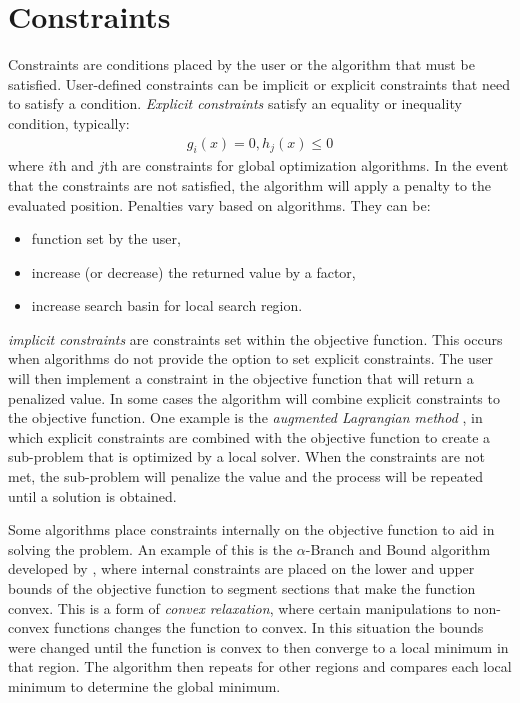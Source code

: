 \section{Constraints}
Constraints are conditions placed by the user or the algorithm that must be satisfied. User-defined constraints can be implicit or explicit constraints that need to satisfy a condition. \textit{Explicit constraints} satisfy an equality or inequality condition, typically:
\begin{align}
    \label{eq:constraints}
    g_i(x) = 0, 
    h_j(x) \leq 0 
\end{align}
where $i$th and $j$th are constraints for global optimization algorithms. In the event that the constraints are not satisfied, the algorithm will apply a penalty to the evaluated position. Penalties vary based on algorithms. They can be:
\begin{itemize}
    \item function set by the user,
    \item increase (or decrease) the returned value by a factor, 
    \item increase search basin for local search region.
\end{itemize}

\textit{implicit constraints} are constraints set within the objective function. This occurs when algorithms do not provide the option to set explicit constraints. The user will then implement a constraint in the objective function that will return a penalized value. In some cases the algorithm will combine explicit constraints to the objective function. One example is the \textit{augmented Lagrangian method} \cite{Mathematics2008}, in which explicit constraints are combined with the objective function to create a sub-problem that is optimized by a local solver. When the constraints are not met, the sub-problem will penalize the value and the process will be repeated until a solution is obtained.

Some algorithms place constraints internally on the objective function to aid in solving the problem. An example of this is the $\alpha$-Branch and Bound algorithm developed by \cite{adjiman2013}, where internal constraints are placed on the lower and upper bounds of the objective function to segment sections that make the function convex. This is a form of \textit{convex relaxation}, where certain manipulations to non-convex functions
changes the function to convex. In this situation the bounds were changed until the function is convex to then converge to a local minimum in that region. The algorithm then repeats for other regions and compares each local minimum to determine the global minimum. 

